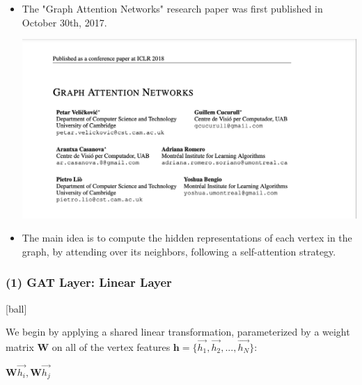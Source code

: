 \documentclass{beamer}
\begin{document}

\begin{frame}[fragile]
\begin{itemize}
\frametitle{Graph Attention Network (GAT)}
[ball]

\item The "Graph Attention Networks" research paper was first published in October 30th, 2017.

\vspace{0.3cm}

\begin{minipage}[c]{\linewidth}
    \hspace{1.5cm}
    \includegraphics[width=0.7\linewidth]{GNN/imgs/gat.png}
\end{minipage}

\vspace{0.3cm}

\item The main idea is to compute the hidden representations of each vertex in the
graph, by attending over its neighbors, following a self-attention strategy.

\end{itemize}
\end{frame}


\begin{frame}[fragile]
\begin{itemize}
\frametitle{(1) GAT Layer: Linear Layer}
[ball]

\item We begin by applying a shared
linear transformation, parameterized by a weight matrix $\textbf{W}$ on all of the vertex features $\textbf{h} = \{\overrightarrow{h_{1}},\overrightarrow{h_{2}},...,\overrightarrow{h_{N}} \}$:

\begin{center}
    \item[] $\textbf{W}\overrightarrow{h_{i}}, \textbf{W}\overrightarrow{h_{j}}$
\end{center}

\end{itemize}
\end{frame}
\end{document}
